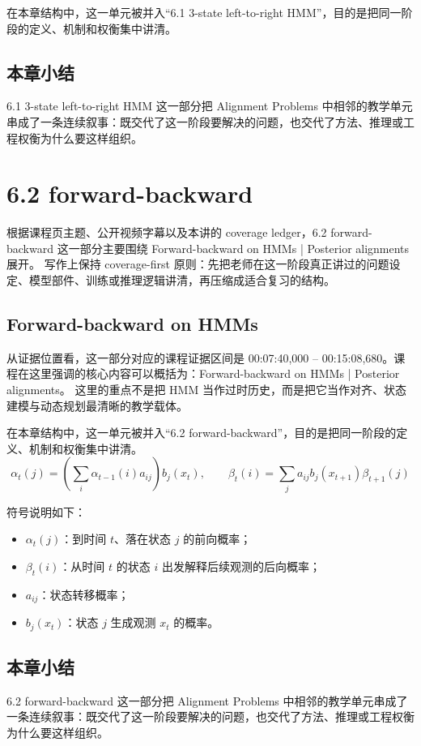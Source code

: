 \documentclass[a4paper]{article}
\begin{document}
在本章结构中，这一单元被并入“6.1 3-state left-to-right HMM”，目的是把同一阶段的定义、机制和权衡集中讲清。

\subsection{本章小结}
6.1 3-state left-to-right HMM 这一部分把 Alignment Problems 中相邻的教学单元串成了一条连续叙事：既交代了这一阶段要解决的问题，也交代了方法、推理或工程权衡为什么要这样组织。

\section{6.2 forward-backward}
根据课程页主题、公开视频字幕以及本讲的 coverage ledger，6.2 forward-backward 这一部分主要围绕 Forward-backward on HMMs | Posterior alignments 展开。
写作上保持 coverage-first 原则：先把老师在这一阶段真正讲过的问题设定、模型部件、训练或推理逻辑讲清，再压缩成适合复习的结构。

\subsection{Forward-backward on HMMs}
从证据位置看，这一部分对应的课程证据区间是 00:07:40,000 -- 00:15:08,680。课程在这里强调的核心内容可以概括为：Forward-backward on HMMs | Posterior alignments。
这里的重点不是把 HMM 当作过时历史，而是把它当作对齐、状态建模与动态规划最清晰的教学载体。

在本章结构中，这一单元被并入“6.2 forward-backward”，目的是把同一阶段的定义、机制和权衡集中讲清。
\[
\alpha_t(j) = \left( \sum_i \alpha_{t-1}(i) a_{ij} \right) b_j(x_t), \qquad
\beta_t(i) = \sum_j a_{ij} b_j(x_{t+1}) \beta_{t+1}(j)
\]

符号说明如下：
\begin{itemize}
\item $\alpha_t(j)$：到时间 $t$、落在状态 $j$ 的前向概率；
\item $\beta_t(i)$：从时间 $t$ 的状态 $i$ 出发解释后续观测的后向概率；
\item $a_{ij}$：状态转移概率；
\item $b_j(x_t)$：状态 $j$ 生成观测 $x_t$ 的概率。
\end{itemize}

\subsection{本章小结}
6.2 forward-backward 这一部分把 Alignment Problems 中相邻的教学单元串成了一条连续叙事：既交代了这一阶段要解决的问题，也交代了方法、推理或工程权衡为什么要这样组织。
\end{document}
